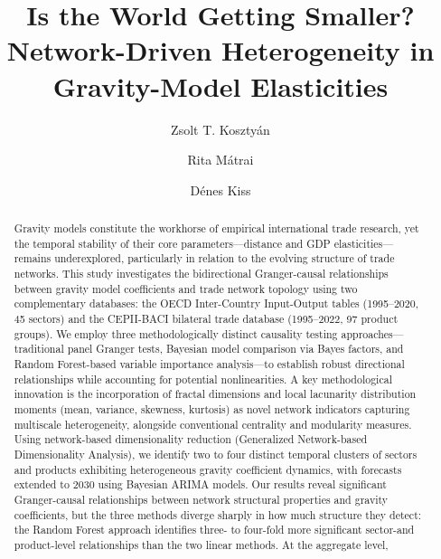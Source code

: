 \documentclass[preprint, 3p,
authoryear]{elsarticle} %
\begin{document}
\begin{frontmatter}

  \title{Is the World Getting Smaller? Network-Driven Heterogeneity in
Gravity-Model Elasticities}
    \author[Department of Quantitative Methods, University of
Pannonia]{Zsolt T. Kosztyán%
  }
    \author[Department of Quantitative Methods, University of
Pannonia]{Rita Mátrai%
  }
    \author[Department of Quantitative Methods, University of
Pannonia]{Dénes Kiss%
  }
  
  \begin{abstract}
  Gravity models constitute the workhorse of empirical international
  trade research, yet the temporal stability of their core
  parameters---distance and GDP elasticities---remains underexplored,
  particularly in relation to the evolving structure of trade networks.
  This study investigates the bidirectional Granger-causal relationships
  between gravity model coefficients and trade network topology using
  two complementary databases: the OECD Inter-Country Input-Output
  tables (1995--2020, 45 sectors) and the CEPII-BACI bilateral trade
  database (1995--2022, 97 product groups). We employ three
  methodologically distinct causality testing approaches---traditional
  panel Granger tests, Bayesian model comparison via Bayes factors, and
  Random Forest-based variable importance analysis---to establish robust
  directional relationships while accounting for potential
  nonlinearities. A key methodological innovation is the incorporation
  of fractal dimensions and local lacunarity distribution moments (mean,
  variance, skewness, kurtosis) as novel network indicators capturing
  multiscale heterogeneity, alongside conventional centrality and
  modularity measures. Using network-based dimensionality reduction
  (Generalized Network-based Dimensionality Analysis), we identify two
  to four distinct temporal clusters of sectors and products exhibiting
  heterogeneous gravity coefficient dynamics, with forecasts extended to
  2030 using Bayesian ARIMA models. Our results reveal significant
  Granger-causal relationships between network structural properties and
  gravity coefficients, but the three methods diverge sharply in how
  much structure they detect: the Random Forest approach identifies
  three- to four-fold more significant sector-and product-level
  relationships than the two linear methods. At the aggregate level,

\end{abstract}
\end{frontmatter}
\end{document}
